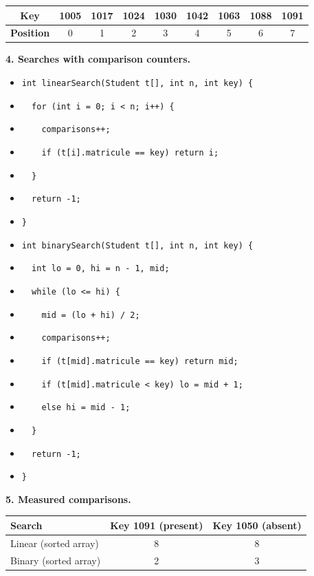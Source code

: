 \documentclass[11pt]{article}
\begin{document}
\begin{center}
\begin{tabular}{|c|c|c|c|c|c|c|c|c|}
\hline
\rowcolor{popblueL} \textbf{Key} & 1005 & 1017 & 1024 & 1030 & 1042 & 1063 & 1088 & 1091 \\
\hline
\textbf{Position} & 0 & 1 & 2 & 3 & 4 & 5 & 6 & 7 \\
\hline
\end{tabular}
\end{center}

\textbf{4. Searches with comparison counters.}

\begin{itemize}
\item[] \texttt{int linearSearch(Student t[], int n, int key) \{}
\item[] \texttt{\ \ for (int i = 0; i < n; i++) \{}
\item[] \texttt{\ \ \ \ comparisons++;}
\item[] \texttt{\ \ \ \ if (t[i].matricule == key) return i;}
\item[] \texttt{\ \ \}}
\item[] \texttt{\ \ return -1;}
\item[] \texttt{\}}
\item[] \texttt{int binarySearch(Student t[], int n, int key) \{}
\item[] \texttt{\ \ int lo = 0, hi = n - 1, mid;}
\item[] \texttt{\ \ while (lo <= hi) \{}
\item[] \texttt{\ \ \ \ mid = (lo + hi) / 2;}
\item[] \texttt{\ \ \ \ comparisons++;}
\item[] \texttt{\ \ \ \ if (t[mid].matricule == key) return mid;}
\item[] \texttt{\ \ \ \ if (t[mid].matricule < key) lo = mid + 1;}
\item[] \texttt{\ \ \ \ else hi = mid - 1;}
\item[] \texttt{\ \ \}}
\item[] \texttt{\ \ return -1;}
\item[] \texttt{\}}
\end{itemize}

\textbf{5. Measured comparisons.}

\begin{center}
\begin{tabular}{|l|c|c|}
\hline
\rowcolor{popblueL} \textbf{Search} & \textbf{Key 1091 (present)} & \textbf{Key 1050 (absent)} \\
\hline
Linear (sorted array) & 8 & 8 \\
\hline
Binary (sorted array) & 2 & 3 \\
\hline
\end{tabular}
\end{center}
\end{document}
